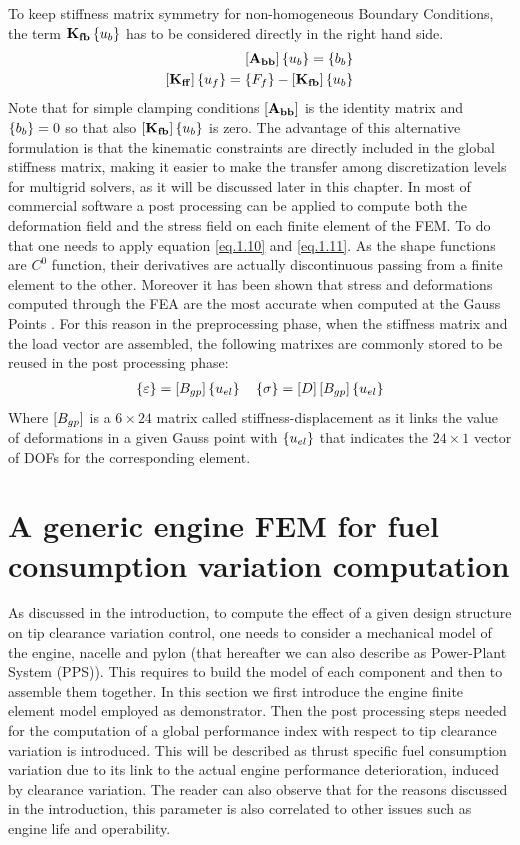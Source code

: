 To keep stiffness matrix symmetry for non-homogeneous Boundary Conditions, the term  $\mathbf{K_{fb}}\left\lbrace{u_b}\right \rbrace$ has to be considered directly in the right hand side.
\begin{eqnarray}
\label{eq.1.17s}
\left[{\mathbf{A_{bb}}}\right]\left\lbrace{u_b}\right \rbrace=\left\lbrace{b_b}\right \rbrace\\
\label{eq.1.18s}
\left[{\mathbf{K_{ff}}}\right]\left\lbrace{u_f}\right \rbrace=\left\lbrace{F_f}\right \rbrace-\left[{\mathbf{K_{fb}}}\right]\left\lbrace{u_b}\right \rbrace
\end{eqnarray}
Note that for simple clamping conditions $\left[{\mathbf{A_{bb}}}\right]$ is the identity matrix and $\left\lbrace{b_b}\right \rbrace=0$  so that also $\left[{\mathbf{K_{fb}}}\right]\left\lbrace{u_b}\right \rbrace$ is zero.
The advantage of this alternative formulation is that the kinematic constraints are directly included in the global stiffness matrix, making it easier to make the transfer among discretization levels for multigrid solvers, as it will be discussed later in this chapter.
In most of commercial software a post processing can be applied to compute both the deformation field and the stress field on each finite element of the FEM. To do that one needs to apply equation \eqref{eq.1.10} and \eqref{eq.1.11}. As the shape functions are $C^0$ function, their derivatives are actually discontinuous passing from a finite element to the other. Moreover it has been shown that stress and deformations computed through the FEA are the most accurate when computed at the Gauss Points \cite{zlamal1978superconvergence,zhang2006natural}. For this reason in the preprocessing phase, when the stiffness matrix and the load vector are assembled, the following matrixes are commonly stored to be reused in the post processing phase:
\begin{eqnarray}
\label{eq.1.40}
	\left\lbrace{\varepsilon}\right \rbrace=\left[{B_{gp}}\right]\left\lbrace{u_{el}}\right \rbrace \quad
	\left\lbrace{\sigma}\right \rbrace=\left[{D}\right]\left[{B_{gp}}\right]\left\lbrace{u_{el}}\right \rbrace
\end{eqnarray}
Where $\left[{B_{gp}}\right]$ is a $6\times 24$ matrix called stiffness-displacement as it links the value of deformations in a given Gauss point with $\left\lbrace{u_{el}}\right \rbrace$ that indicates the $24\times1$ vector of DOFs for the corresponding element.
\section{A generic engine FEM for fuel consumption variation computation}
As discussed in the introduction, to compute the effect of a given design structure on tip clearance variation control, one needs to consider a mechanical model of the engine, nacelle and pylon (that hereafter we can also describe as Power-Plant System (PPS)). This requires to build the model of each component and then to assemble them together.
In this section we first introduce the engine finite element model employed as demonstrator. Then the post processing steps needed for the computation of a global performance index with respect to tip clearance variation is introduced. This will be described as thrust specific fuel consumption variation due to its link to the actual engine performance deterioration, induced by clearance variation. The reader can also observe that for the reasons discussed in the introduction, this parameter is also correlated to other issues such as engine life and operability.
